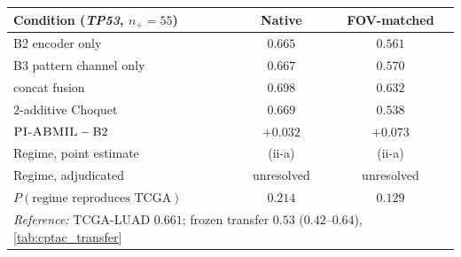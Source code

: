 \footnotesize
\setlength{\tabcolsep}{6pt}
\renewcommand{\arraystretch}{1.2}
\begin{tabular}{l c c}
\toprule
\textbf{Condition (\textit{TP53}, $n_+\!=\!55$)} & \textbf{Native} & \textbf{FOV-matched} \\
\midrule
B2 \quad encoder only                & $0.665$ & $0.561$ \\
B3 \quad pattern channel only        & $0.667$ & $0.570$ \\
\piabmil{} \quad concat fusion       & $0.698$ & $0.632$ \\
\fcmil{} \quad $2$-additive Choquet  & $0.669$ & $0.538$ \\
\midrule
$\textsc{PI-ABMIL}{}-\mathrm{B2}$             & $+0.032$ & $+0.073$ \\
Regime, point estimate               & (ii-a) & (ii-a) \\
Regime, adjudicated                  & unresolved & unresolved \\
$P(\text{regime reproduces TCGA})$   & $0.214$ & $0.129$ \\
\midrule
\multicolumn{3}{l}{\emph{Reference:} TCGA-LUAD $0.661$; frozen transfer $0.53$
($0.42$--$0.64$), \cref{tab:cptac_transfer}} \\
\bottomrule
\end{tabular}
